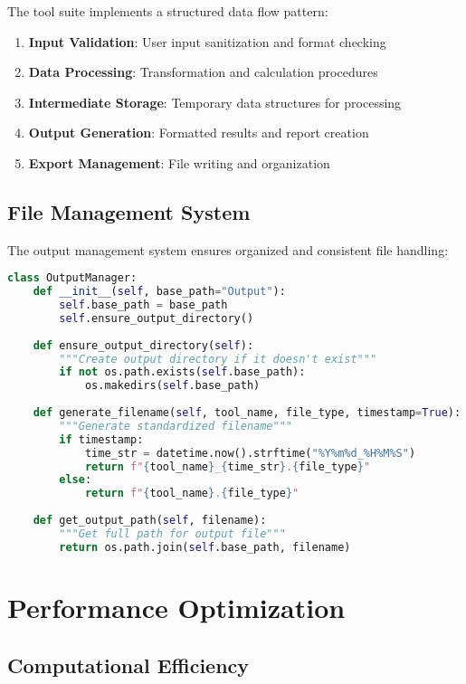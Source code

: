 \documentclass[binding=0.6cm]{sapthesis}
\begin{document}
The tool suite implements a structured data flow pattern:

\begin{enumerate}
    \item \textbf{Input Validation}: User input sanitization and format checking
    \item \textbf{Data Processing}: Transformation and calculation procedures
    \item \textbf{Intermediate Storage}: Temporary data structures for processing
    \item \textbf{Output Generation}: Formatted results and report creation
    \item \textbf{Export Management}: File writing and organization
\end{enumerate}

\subsection{File Management System}

The output management system ensures organized and consistent file handling:

\begin{lstlisting}[language=Python, caption=Output Management Implementation]
class OutputManager:
    def __init__(self, base_path="Output"):
        self.base_path = base_path
        self.ensure_output_directory()
    
    def ensure_output_directory(self):
        """Create output directory if it doesn't exist"""
        if not os.path.exists(self.base_path):
            os.makedirs(self.base_path)
    
    def generate_filename(self, tool_name, file_type, timestamp=True):
        """Generate standardized filename"""
        if timestamp:
            time_str = datetime.now().strftime("%Y%m%d_%H%M%S")
            return f"{tool_name}_{time_str}.{file_type}"
        else:
            return f"{tool_name}.{file_type}"
    
    def get_output_path(self, filename):
        """Get full path for output file"""
        return os.path.join(self.base_path, filename)
\end{lstlisting}

\section{Performance Optimization}

\subsection{Computational Efficiency}
\end{document}
